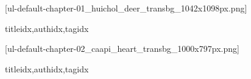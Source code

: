 

  \setcounter{chapter}{0}

  [ul-default-chapter-01_huichol_deer_transbg_1042x1098px.png]
    \begin{songs}{titleidx,authidx,tagidx}
      
    \end{songs}

  [ul-default-chapter-02_caapi_heart_transbg_1000x797px.png]
    \begin{songs}{titleidx,authidx,tagidx}
      
    \end{songs}


